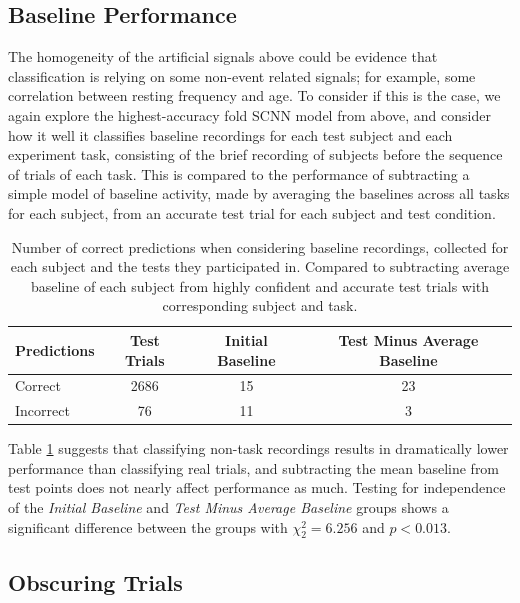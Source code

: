 \documentclass[fleqn,10pt]{wlscirep}
\begin{document}
\subsection*{Baseline Performance}

The homogeneity of the artificial signals above could be evidence that classification is relying on some non-event related signals; for example, some correlation between resting frequency and age. To consider if this is the case, we again explore the highest-accuracy fold SCNN model from above, and consider how it well it classifies baseline recordings for each test subject and each experiment task, consisting of the brief recording of subjects before the sequence of trials of each task. This is compared to the performance of subtracting a simple model of baseline activity, made by averaging the baselines across all tasks for each subject, from an accurate test trial for each subject and test condition.

\begin{table}[h]
 \caption{Number of correct predictions when considering baseline recordings, collected for each subject and the tests they participated in. Compared to subtracting average baseline of each subject from highly confident and accurate test trials with corresponding subject and task.}
 \centering
 \begin{tabular}{l | c | c | c}
   \toprule
   \textbf{Predictions} & \textbf{Test Trials} & \textbf{Initial Baseline} & \textbf{Test Minus Average Baseline} \\
   \toprule
                        Correct           & 2686 & 15 & 23  \\
                        Incorrect         &  76  & 11 &  3  \\ 
   \bottomrule
 \end{tabular}
 \label{tab:rest_performance3}
\end{table}

Table \ref{tab:rest_performance3} suggests that classifying non-task recordings results in dramatically lower performance than classifying real trials, and subtracting the mean baseline from test points does not nearly affect performance as much. Testing for independence of the {\em Initial Baseline} and {\em Test Minus Average Baseline} groups shows a significant difference between the groups with $\chi^2_{2}=6.256$ and $p<0.013$.

\subsection*{Obscuring Trials}
\end{document}
